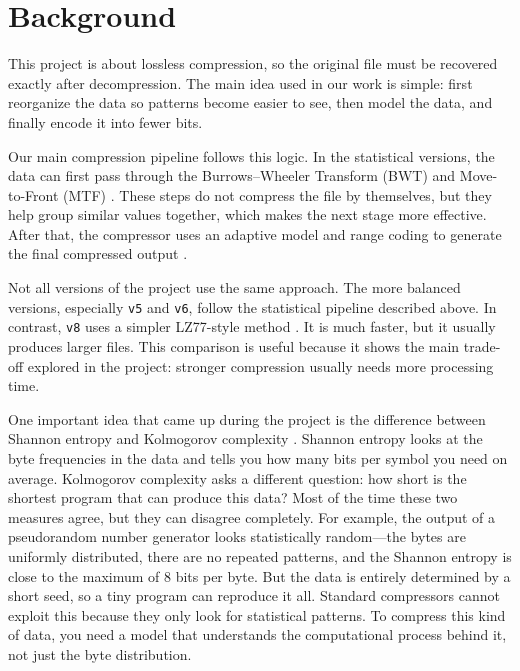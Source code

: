 \section{Background}
\label{sec:background}

This project is about lossless compression, so the original file must be recovered exactly after decompression. The main idea used in our work is simple: first reorganize the data so patterns become easier to see, then model the data, and finally encode it into fewer bits.

Our main compression pipeline follows this logic. In the statistical versions, the data can first pass through the Burrows--Wheeler Transform (BWT) \cite{burrows1994} and Move-to-Front (MTF) \cite{bentley1986}. These steps do not compress the file by themselves, but they help group similar values together, which makes the next stage more effective. After that, the compressor uses an adaptive model \cite{cleary1984} and range coding to generate the final compressed output \cite{rissanen1979,schindler1998}.

Not all versions of the project use the same approach. The more balanced versions, especially \texttt{v5} and \texttt{v6}, follow the statistical pipeline described above. In contrast, \texttt{v8} uses a simpler LZ77-style method \cite{ziv1977,colletlz4}. It is much faster, but it usually produces larger files. This comparison is useful because it shows the main trade-off explored in the project: stronger compression usually needs more processing time.

One important idea that came up during the project is the difference between Shannon entropy and Kolmogorov complexity \cite{kolmogorov1965,shannon1948}. Shannon entropy looks at the byte frequencies in the data and tells you how many bits per symbol you need on average. Kolmogorov complexity asks a different question: how short is the shortest program that can produce this data? Most of the time these two measures agree, but they can disagree completely. For example, the output of a pseudorandom number generator looks statistically random---the bytes are uniformly distributed, there are no repeated patterns, and the Shannon entropy is close to the maximum of 8 bits per byte. But the data is entirely determined by a short seed, so a tiny program can reproduce it all. Standard compressors cannot exploit this because they only look for statistical patterns. To compress this kind of data, you need a model that understands the computational process behind it, not just the byte distribution.
